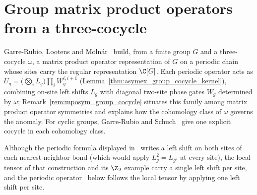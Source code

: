 
\section{Group matrix product operators from a three-cocycle}%
\label{sec:asymex_group_cocycle_mpo}

Garre-Rubio, Lootens and Molnár~\cite{GarreRubio2023MPOSym} build, from a
finite group $G$ and a three-cocycle $\omega$, a matrix product operator
representation of $G$ on a periodic chain whose sites carry the regular
representation $\C[G]$. Each periodic operator acts as
$U_g=\bigl(\bigotimes_iL_g\bigr)\prod_iW_g^{i,i+1}$
(Lemma~\ref{thm:asymex_group_cocycle_kernel}), combining on-site left shifts
$L_g$ with diagonal two-site phase gates $W_g$ determined by $\omega$;
Remark~\ref{rem:mposym_group_cocycle} situates this family among matrix
product operator symmetries and explains how the cohomology class of $\omega$
governs the anomaly. For cyclic groups,
Garre-Rubio and Schuch~\cite{GarreRubioSchuch2024DomainWall} give one explicit
cocycle in each cohomology class.

Although the periodic formula displayed in~\cite{GarreRubio2023MPOSym} writes a
left shift on both sites of each nearest-neighbor bond (which would apply
$L_g^2=L_{g^2}$ at every site), the local tensor of that construction and its
$\Z_2$ example carry a single left shift per site, and the periodic
operator~\cite{gap:glm23_pbc_group_mpo_single_shift} below follows the local
tensor by applying one left shift per site.

